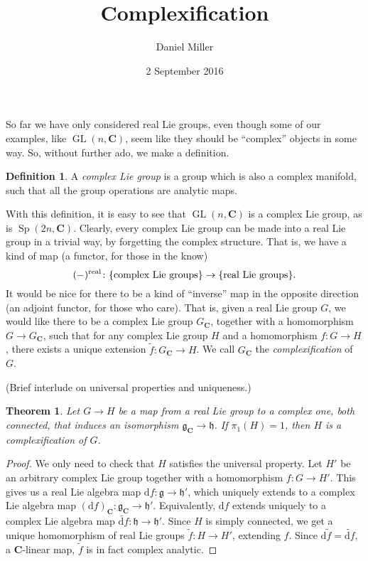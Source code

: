 \documentclass{article}
\title{Complexification}
\author{Daniel Miller}
\date{2 September 2016}
\DeclareMathOperator{\GL}{GL}
\DeclareMathOperator{\Sp}{Sp}
\newcommand{\bC}{{\mathbf C}}
\newcommand{\fg}{{\mathfrak g}}
\newcommand{\fh}{{\mathfrak h}}
\newcommand{\dd}{\mathrm{d}}
\newcommand{\real}{\mathrm{real}}
\newtheorem{theorem}{Theorem}
\theoremstyle{definition}
\newtheorem{definition}{Definition}
\begin{document}
\maketitle





So far we have only considered real Lie groups, even though some of our 
examples, like $\GL(n,\bC)$, seem like they should be ``complex'' objects in 
some way. So, without further ado, we make a definition. 

\begin{definition}
A \emph{complex Lie group} is a group which is also a complex manifold, such 
that all the group operations are analytic maps.  
\end{definition}

With this definition, it is easy to see that $\GL(n,\bC)$ is a complex Lie 
group, as is $\Sp(2n,\bC)$. Clearly, every complex Lie group can be made into 
a real Lie group in a trivial way, by forgetting the complex structure. That 
is, we have a kind of map (a functor, for those in the know)
\[
	(-)^\real \colon \{\textnormal{complex Lie groups}\} \to \{\textnormal{real Lie groups}\} .
\]
It would be nice for there to be a kind of ``inverse'' map in the opposite 
direction (an adjoint functor, for those who care). That is, given a real Lie 
group $G$, we would like there to be a complex Lie group $G_\bC$, together 
with a homomorphism $G\to G_\bC$, such that for any complex Lie group $H$ and 
a homomorphism $f\colon G\to H$, there exists a unique extension 
$\widetilde f\colon G_\bC \to H$. We call $G_\bC$ the \emph{complexification} 
of $G$. 

(Brief interlude on universal properties and uniqueness.)

\begin{theorem}
Let $G\to H$ be a map from a real Lie group to a complex one, both connected, 
that induces an isomorphism $\fg_\bC \to \fh$. If $\pi_1(H)=1$, then $H$ is a 
complexification of $G$. 
\end{theorem}
\begin{proof}
We only need to check that $H$ satisfies the universal property. Let 
$H'$ be an arbitrary complex Lie group together with a homomorphism 
$f\colon G\to H'$. This gives us a real Lie algebra map 
$\dd f\colon \fg \to \fh'$, which uniquely extends to a complex Lie algebra 
map $(\dd f)_\bC\colon \fg_\bC\to \fh'$. Equivalently, $\dd f$ extends uniquely 
to a complex Lie algebra map $\widetilde{\dd f}\colon \fh\to \fh'$. Since 
$H$ is simply connected, we get a unique homomorphism of real Lie groups 
$\widetilde f\colon H\to H'$, extending $f$. Since 
$\dd \widetilde f = \widetilde{\dd f}$, a $\bC$-linear map, $\widetilde f$ is 
in fact complex analytic. 
\end{proof}
\end{document}
